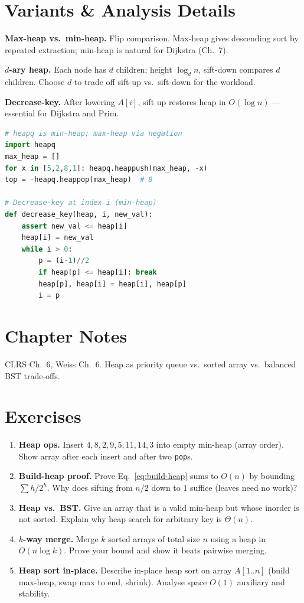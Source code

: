 
\section{Variants \& Analysis Details}
\label{sec:heap-variants}
\textbf{Max-heap vs.\ min-heap.} Flip comparison. Max-heap gives descending sort by repeated extraction; min-heap is natural for Dijkstra (Ch.~7).

\textbf{$d$-ary heap.} Each node has $d$ children; height $\log_{d}n$, sift-down compares $d$ children. Choose $d$ to trade off sift-up vs.\ sift-down for the workload.

\textbf{Decrease-key.} After lowering $A[i]$, sift up restores heap in $O(\log n)$ --- essential for Dijkstra and Prim.

\begin{lstlisting}[language=Python]
# heapq is min-heap; max-heap via negation
import heapq
max_heap = []
for x in [5,2,8,1]: heapq.heappush(max_heap, -x)
top = -heapq.heappop(max_heap)  # 8

# Decrease-key at index i (min-heap)
def decrease_key(heap, i, new_val):
    assert new_val <= heap[i]
    heap[i] = new_val
    while i > 0:
        p = (i-1)//2
        if heap[p] <= heap[i]: break
        heap[p], heap[i] = heap[i], heap[p]
        i = p
\end{lstlisting}

\section{Chapter Notes}
CLRS Ch.~6, Weiss Ch.~6. Heap as priority queue vs.\ sorted array vs.\ balanced BST trade-offs.

\section{Exercises}
\label{sec:ch05-exercises}
\begin{enumerate}[label=E5.\arabic*, leftmargin=*, itemsep=0.7em]
    \item \textbf{Heap ops.} Insert $4,8,2,9,5,11,14,3$ into empty min-heap (array order). Show array after each insert and after two \texttt{pop}s.
    \item \textbf{Build-heap proof.} Prove Eq.~\eqref{eq:build-heap} sums to $O(n)$ by bounding $\sum h/2^{h}$. Why does sifting from $n/2$ down to $1$ suffice (leaves need no work)?
    \item \textbf{Heap vs.\ BST.} Give an array that is a valid min-heap but whose inorder is not sorted. Explain why heap search for arbitrary key is $\Theta(n)$.
    \item \textbf{$k$-way merge.} Merge $k$ sorted arrays of total size $n$ using a heap in $O(n\log k)$. Prove your bound and show it beats pairwise merging.
    \item \textbf{Heap sort in-place.} Describe in-place heap sort on array $A[1..n]$ (build max-heap, swap max to end, shrink). Analyse space $O(1)$ auxiliary and stability.
\end{enumerate}
